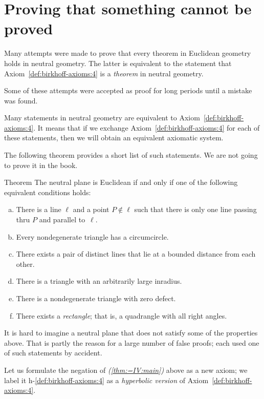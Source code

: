 \section{Proving that something cannot be proved}
\label{sec:unprovable}

Many attempts were made to prove that every theorem in Euclidean geometry holds in neutral geometry.
The latter is equivalent to the statement that Axiom~\ref{def:birkhoff-axioms:4} is a \textit{theorem} in neutral geometry.

Some of these attempts were accepted as proof for long periods until a mistake was found.

Many statements in neutral geometry are equivalent to Axiom~\ref{def:birkhoff-axioms:4}.
It means that if we exchange Axiom~\ref{def:birkhoff-axioms:4} for each of these statements, then we will obtain an equivalent axiomatic system.

The following theorem provides a short list of such statements.
We are not going to prove it in the book.

\begin{thm}{Theorem}\label{thm:=IV}
The neutral plane is Euclidean if and only if one of the following equivalent conditions holds:
\begin{enumerate}[(a)]
\item\label{thm:=IV:main} 
There is a line $\ell$ 
and a point $P\notin\ell$ 
such that there is only one line passing thru $P$ 
and parallel to~$\ell$.
\item 
Every nondegenerate triangle has a circumcircle.
\item
There exists a pair of distinct lines that lie at a bounded distance from each other.
\item
There is a triangle with an arbitrarily large inradius.
\item\label{thm:=IV:defect}
There is a nondegenerate triangle with zero defect.
\item\label{thm:=IV:rectangle}
There exists a \emph{rectangle}; that is, a quadrangle with all right angles.
\end{enumerate}
\end{thm}

It is hard to imagine a neutral plane that does not satisfy some of the properties above.
That is partly the reason for a large number of false proofs;
each used one of such statements by accident.

Let us formulate the negation of \textit{(\ref{thm:=IV:main})} above as a new axiom;
we label it h-$\!$\ref{def:birkhoff-axioms:4} as a \textit{hyperbolic version} of Axiom~\ref{def:birkhoff-axioms:4}.

